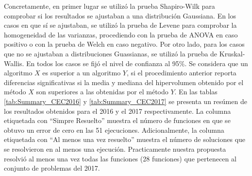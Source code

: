 %
Concretamente, en primer lugar se utilizó la prueba Shapiro-Wilk para comprobar si los resultados se ajustaban a una distribución Gaussiana. 
%
En los casos en que sí se ajustaban, se utilizó la prueba de Levene para comprobar la homogeneidad de las varianzas, procediendo con la prueba de ANOVA en caso positivo o con la prueba de Welch en caso negativo.
%
Por otro lado, para los casos que no se ajustaban a distribuciones Guassianas, se utilizó la prueba de Kruskal-Wallis.
%
En todos los casos se fijó el nivel de confianza al 95\%.
%
Se considera que un algoritmo $X$ es superior a un algoritmo $Y$, si el procedimiento anterior reporta diferencias significativas si la media y mediana del hipervolumen obtenido por el método $X$ son superiores a las obtenidas por el método $Y$.
%
En las tablas \ref{tab:Summary_CEC2016} y \ref{tab:Summary_CEC2017} se presenta un resúmen de los resultados obtenidos para el \CEC{} 2016 y el \CEC{} 2017 respectivamente.
%
La columna etiquetada con ``Simpre Resuelto'' muestra el número de funciones en que se obtuvo un error de cero en las 51 ejecuciones.
%
Adicionalmente, la columna etiquetada con ``Al menos una vez resuelto'' muestra el número de soluciones que se resolvieron en al menos una ejecución.
%
Practicamente nuestra propuesta resolvió al menos una vez todas las funciones (28 funciones) que pertenecen al conjunto de problemas del \CEC{} 2017.
